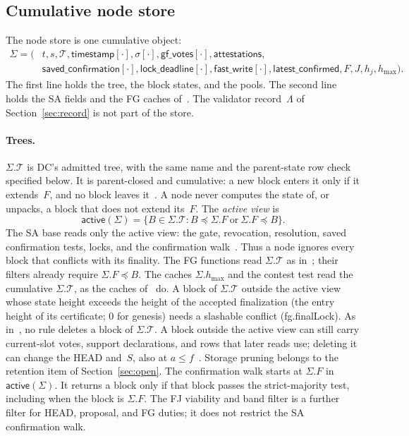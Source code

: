 \documentclass{article}
\theoremstyle{plain}
\theoremstyle{definition}
\theoremstyle{remark}
\newcommand{\act}{\mathsf{active}}
\newcommand{\T}{\mathcal T}
\newcommand{\hmax}{h_{\max}}
\newcommand{\gfPool}{\mathsf{gf\_votes}}
\newcommand{\attestations}{\mathsf{attestations}}
\newcommand{\latestConfirmed}{\mathsf{latest\_confirmed}}
\newcommand{\timestamp}{\mathsf{timestamp}}
\newcommand{\savedConfirmation}{\mathsf{saved\_confirmation}}
\newcommand{\lockDeadline}{\mathsf{lock\_deadline}}
\newcommand{\fastWrite}{\mathsf{fast\_write}}
\newcommand{\DC}[1]{\cite[\S#1]{DC}}
\begin{document}
\subsection{Cumulative node store}\label{sec:complete-store}

The node store is one cumulative object:
\[
\begin{split}
 \Sigma=(&t,s,\T,\timestamp[\cdot],\sigma[\cdot],
 \gfPool[\cdot],\attestations,\\
 &\savedConfirmation[\cdot],\lockDeadline[\cdot],\fastWrite[\cdot],\latestConfirmed,
 F,J,h_j,\hmax).
\end{split}
\]
The first line holds the tree, the block states, and the pools.  The
second line holds the SA fields and the FG caches of~\DC{5}.  The
validator record~$\Lambda$ of Section~\ref{sec:record} is not part of
the store.

\paragraph{Trees.}  $\Sigma.\T$ is DC's admitted tree, with the same
name and the parent-state row check specified below.  It is parent-closed and
cumulative: a new block enters it only if it extends~$F$, and no block
leaves it~\cite{DC}.  A node never computes the state of, or unpacks, a
block that does not extend its~$F$.  The \emph{active view} is
\[
 \act(\Sigma)=\{B\in\Sigma.\T: B\preceq\Sigma.F\ \text{or}\ \Sigma.F\preceq B\}.
\]
The SA base reads only the active view: the gate, revocation, resolution,
saved confirmation tests, locks, and the confirmation walk~\cite[\S2]{FB}.
Thus a node ignores every block that conflicts with its finality.  The
FG functions read $\Sigma.\T$ as in~\DC{7}; their filters already
require $\Sigma.F\preceq B$.  The caches $\Sigma.\hmax$ and the contest
test read the cumulative $\Sigma.\T$, as the caches of~\DC{5} do.  A
block of $\Sigma.\T$ outside the active view whose state height exceeds
the height of the accepted finalization (the entry height of its
certificate; $0$ for genesis) needs a slashable conflict
(\textsf{fg.finalLock}).  As in~\cite{DC}, no rule deletes a block of
$\Sigma.\T$.  A block outside the active view can still carry
current-slot votes, support declarations, and rows that later reads
use; deleting it can change the HEAD and~$S$, also at
$a\leq f$~\cite[M1, N2]{FR}.  Storage pruning belongs to the retention
item of Section~\ref{sec:open}.  The confirmation walk starts at $\Sigma.F$ in $\act(\Sigma)$.
It returns a block only if that block passes the strict-majority
test, including when the block is $\Sigma.F$.
The FJ viability and band filter is a further filter for HEAD,
proposal, and FG duties; it does not restrict the SA confirmation walk.
\end{document}
